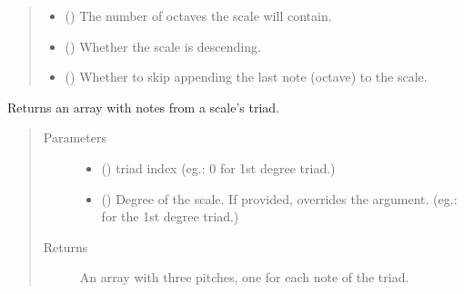 \documentclass[letterpaper,10pt,english]{sphinxmanual}
\begin{document}
\begin{fulllineitems}
\begin{fulllineitems}
\begin{quote}
\begin{description}
\begin{itemize}
\item {} 
 () \textendash{} The number of octaves the scale will contain.

\item {} 
 () \textendash{} Whether the scale is descending.

\item {} 
 () \textendash{} Whether to skip appending the last
note (octave) to the scale.

\end{itemize}

\end{description}\end{quote}

\end{fulllineitems}


\begin{fulllineitems}
\label{\detokenize{birdears:birdears.scale.DiatonicScale.get_triad}}
Returns an array with notes from a scale’s triad.
\begin{quote}\begin{description}
\item[{Parameters}] \leavevmode\begin{itemize}
\item {} 
 () \textendash{} triad index (eg.: 0 for 1st degree triad.)

\item {} 
 () \textendash{} Degree of the scale. If provided, overrides the
 argument. (eg.:  for the 1st degree triad.)

\end{itemize}

\item[{Returns}] \leavevmode
An array with three pitches, one for each note of the triad.

\end{description}\end{quote}

\end{fulllineitems}


\end{fulllineitems}
\end{document}
